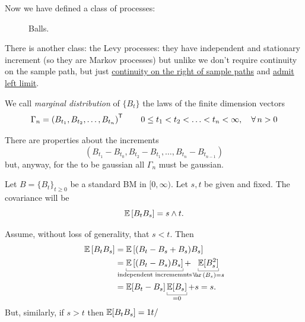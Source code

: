 \documentclass{report}
\begin{document}
Now we have defined a class of processes:
\begin{figure}[H]
	\centering
	\caption{Balls.}
\end{figure}
There is another class: the Levy processes: they have independent and stationary increment (so they are Markov processes) but unlike \bwm{} we don't require continuity on the sample path, but just \ul{continuity on the right of sample paths} and \ul{admit left limit}.
\begin{definition}
	We call \emph{marginal distribution} of $\{B_{t}\}$ the laws of the finite dimension vectors
	\begin{equation*}
		\Gamma_{n}=\left(B_{t_{1}},B_{t_{2}},\ldots,B_{t_{n}}\right)^{\mathsf{T}}\qquad 0\leq t_{1}<t_{2}<\ldots<t_{n}<\infty,\quad\forall\, n>0
	\end{equation*}
\end{definition}
There are properties about the increments
\begin{equation*}
	(B_{t_{1}}-B_{t_{0}},B_{t_{2}}-B_{t_{1}},\ldots,B_{t_{n}}-B_{t_{n-1}})
\end{equation*}
but, anyway, for the \bwm{} to be gaussian all $\Gamma_{n}$ must be gaussian. 
\begin{proposition}
	Let $B={\{B_{t}\}}_{t\geq 0}$ be a standard BM in $[0,\infty)$. Let $s,t$ be given and fixed. The covariance will be 
	\begin{equation*}
		\mathbb{E}\left[B_{t}B_{s}\right]=s\wedge t.
	\end{equation*}
\end{proposition}
\begin{fancyproof}
	Assume, without loss of generality, that $s<t$. Then
	\begin{align*}
		\ev\left[B_{t}B_{s}\right]&=\ev\left[(B_{t}-B_{s}+B_{s})B_{s}\right]\\
		&=\ubracketthin{\ev\left[(B_{t}-B_{s})B_{s}\right]}_{\claptext{independent incrememnts}}+\ubracketthin{\ev[B^{2}_{s}]}_{\var(B_{s})=s}\\
		&=\ev[B_{t}-B_{s}]\ubracketthin{\ev[B_{s}]}_{=0}+s=s.
	\end{align*}
	But, similarly, if $s>t$ then $\mathbb{E}[B_{t}B_{s}]=1t/$
\end{fancyproof}
\clearpage
\listoffigures  
\end{document}
